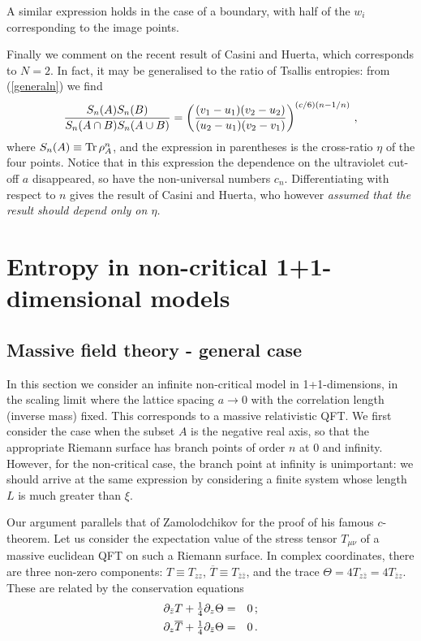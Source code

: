 \documentclass[preprint,aps]{revtex4}
\def\ffrac#1#2{\textstyle{#1\over#2}\displaystyle}
\begin{document}
A similar expression holds in the case of a boundary, with half of the
$w_i$ corresponding to the image points.

Finally we comment on the recent result of Casini and
Huerta\cite{Casini}, which corresponds to $N=2$. In fact, it may be
generalised to the ratio of Tsallis entropies: from (\ref{generaln})
we find
\begin{equation}
{S_n(A)S_n(B)\over S_n(A\cap B)S_n(A\cup B)}=
\left({(v_1-u_1)(v_2-u_2)\over (u_2-u_1)(v_2-v_1)}\right)^{(c/6)(n-1/n)}\,,
\end{equation}
where $S_n(A)\equiv{\rm Tr}\,\rho_A^n$, and
the expression in parentheses is the cross-ratio $\eta$ of the four
points. Notice that in this expression the dependence on
the ultraviolet cut-off $a$ disappeared, so have the non-universal
numbers $c_n$. Differentiating with respect to $n$ gives the result of
Casini and Huerta\cite{Casini}, who however \em assumed \em
that the result should depend only on $\eta$.

\section{Entropy in non-critical 1+1-dimensional models}
\label{sectmass}
\subsection{Massive field theory - general case}
In this section we consider an infinite non-critical
model in 1+1-dimensions, in the scaling limit where the lattice spacing
$a\to0$ with the correlation length (inverse mass) fixed.
This corresponds to a massive relativistic QFT. We first consider the
case when the subset $A$ is the negative real axis, so that the
appropriate Riemann surface has branch points of order $n$ at 0 and
infinity. However, for the non-critical case, the branch point at
infinity is unimportant: we should arrive at the same expression
by considering a finite system whose length $L$ is much greater than
$\xi$.

Our argument parallels that of Zamolodchikov\cite{Zam} for the proof of his
famous $c$-theorem.
Let us consider the expectation value of the stress tensor $T_{\mu\nu}$
of a massive euclidean QFT on such a Riemann surface. In complex
coordinates, there are three non-zero components: $T\equiv T_{zz}$,
$\overline T\equiv T_{\bar z\bar z}$, and the trace
$\Theta=4T_{z\bar z}=4T_{\bar zz}$. These are related by the
conservation equations
\begin{eqnarray}
\label{cons}
\partial_{\bar z}T+\ffrac14\partial_z\Theta&=&0\,;\\
\partial_z\overline T+\ffrac14\partial_{\bar z}\Theta&=&0\,.
\end{eqnarray}
\end{document}
